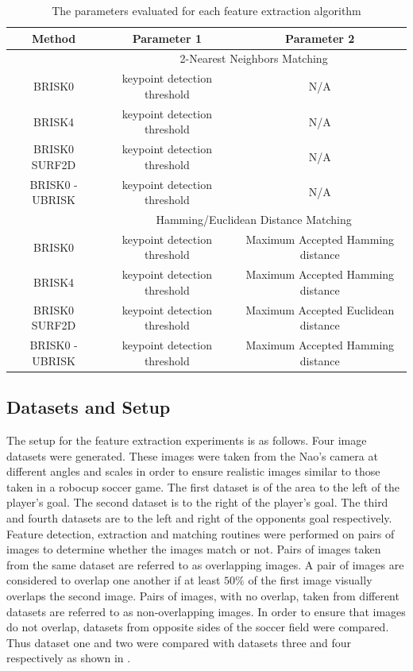 \documentclass{article}
\begin{document}
\begin{table}
\caption{The parameters evaluated for each feature extraction algorithm}
\begin{tabular}{|c|c|c|}
\hline 
Method & Parameter 1 & Parameter 2\tabularnewline
\hline 
 & \multicolumn{2}{c}{2-Nearest Neighbors Matching}\tabularnewline
\hline 
BRISK0 & keypoint detection threshold & N/A\tabularnewline
\hline 
BRISK4 & keypoint detection threshold & N/A\tabularnewline
\hline 
BRISK0 SURF2D & keypoint detection threshold & N/A\tabularnewline
\hline 
BRISK0 - UBRISK & keypoint detection threshold & N/A\tabularnewline
\hline 
 & \multicolumn{2}{c}{Hamming/Euclidean Distance Matching}\tabularnewline
\hline 
BRISK0 & keypoint detection threshold & Maximum Accepted Hamming distance\tabularnewline
\hline 
BRISK4 & keypoint detection threshold & Maximum Accepted Hamming distance\tabularnewline
\hline 
BRISK0 SURF2D & keypoint detection threshold & Maximum Accepted Euclidean distance\tabularnewline
\hline 
BRISK0 - UBRISK & keypoint detection threshold & Maximum Accepted Hamming distance\tabularnewline
\hline 
\end{tabular}
\label{tab:parameters}
\end{table}

\subsection{Datasets and Setup}
\label{sec:datasets}
The setup for the feature extraction experiments is as follows. Four image datasets were generated. These images were taken from the Nao's camera at different angles and scales in order to ensure realistic images similar to those taken in a robocup soccer game. The first dataset is of the area to the left of the player's goal. The second dataset is to the right of the player's goal. The third and fourth datasets are to the left and right of the opponents goal respectively.\\

Feature detection, extraction and matching routines were performed on pairs of images to determine whether the images match or not. Pairs of images taken from the same dataset are referred to as overlapping images. A pair of images are considered to overlap one another if at least $50\%$ of the first image visually overlaps the second image. Pairs of images, with no overlap, taken from different datasets are referred to as non-overlapping images. In order to ensure that images do not overlap, datasets from opposite sides of the soccer field were compared. Thus dataset one and two were compared with datasets three and four respectively as shown in . \\
\end{document}
